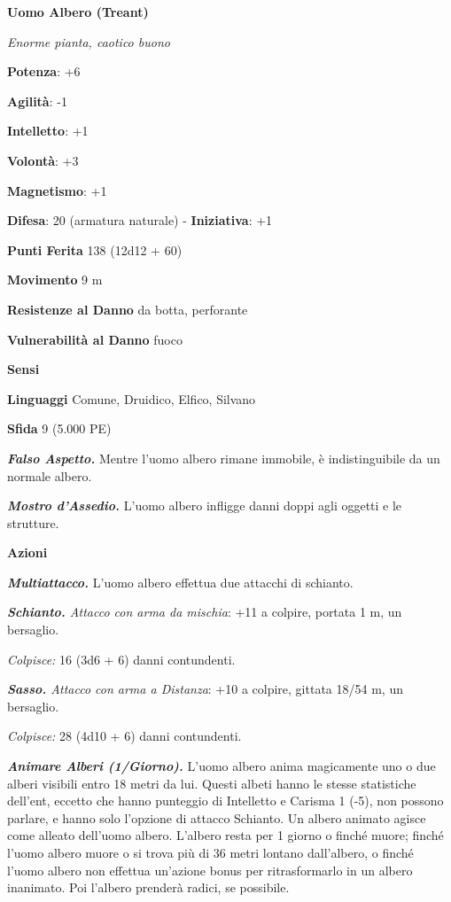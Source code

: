 \begin{multicols}{2}
\textbf{Uomo Albero (Treant)}

\emph{Enorme pianta, caotico buono}

\textbf{Potenza}: +6

\textbf{Agilità}: -1

\textbf{Intelletto}: +1

\textbf{Volontà}: +3

\textbf{Magnetismo}: +1

\textbf{Difesa}: 20 (armatura naturale) - \textbf{Iniziativa}: +1

\textbf{Punti Ferita} 138 (12d12 + 60)

\textbf{Movimento} 9 m

\textbf{Resistenze al Danno} da botta, perforante

\textbf{Vulnerabilità al Danno} fuoco

\textbf{Sensi} 

\textbf{Linguaggi} Comune, Druidico, Elfico, Silvano

\textbf{Sfida} 9 (5.000 PE)\smallskip

\emph{\textbf{Falso Aspetto.}} Mentre l'uomo albero rimane immobile, è
indistinguibile da un normale albero.

\emph{\textbf{Mostro d'Assedio.}} L'uomo albero infligge danni doppi
agli oggetti e le strutture.

\smallskip\textbf{Azioni}

\emph{\textbf{Multiattacco.}} L'uomo albero effettua due attacchi di
schianto.

\emph{\textbf{Schianto.} Attacco con arma da mischia}: +11 a colpire,
portata 1 m, un bersaglio.

\emph{Colpisce:} 16 (3d6 + 6) danni contundenti.

\emph{\textbf{Sasso.} Attacco con arma a Distanza}: +10 a colpire,
gittata 18/54 m, un bersaglio.

\emph{Colpisce:} 28 (4d10 + 6) danni contundenti.

\emph{\textbf{Animare Alberi (1/Giorno).}} L'uomo albero anima
magicamente uno o due alberi visibili entro 18 metri da lui. Questi
albeti hanno le stesse statistiche dell'ent, eccetto che hanno punteggio
di Intelletto e Carisma 1 (-5), non possono parlare, e hanno solo
l'opzione di attacco Schianto. Un albero animato agisce come alleato
dell'uomo albero. L'albero resta per 1 giorno o finché muore; finché
l'uomo albero muore o si trova più di 36 metri lontano dall'albero, o
finché l'uomo albero non effettua un'azione bonus per ritrasformarlo in
un albero inanimato. Poi l'albero prenderà radici, se possibile.




\end{multicols}
